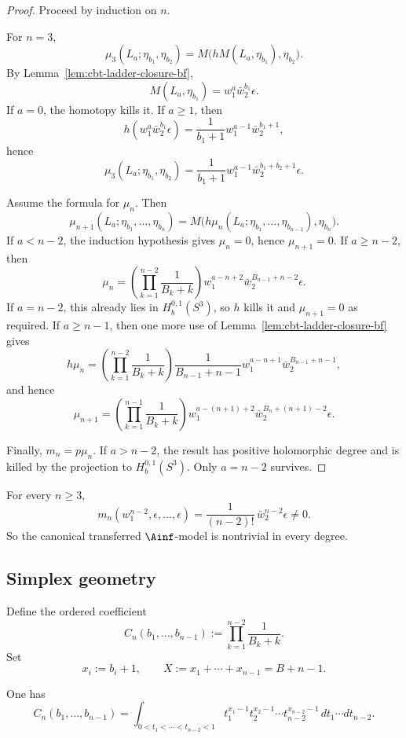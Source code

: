 \begin{proof}
Proceed by induction on $n$.

For $n=3$,
\[
\mu_3(L_a;\eta_{b_1},\eta_{b_2})
=
M\bigl(hM(L_a,\eta_{b_1}),\eta_{b_2}\bigr).
\]
By Lemma~\ref{lem:cbt-ladder-closure-bf},
\[
M(L_a,\eta_{b_1})=w_1^a\bar w_2^{b_1}\epsilon.
\]
If $a=0$, the homotopy kills it. If $a\ge1$, then
\[
h(w_1^a\bar w_2^{b_1}\epsilon)
=
\frac{1}{b_1+1}w_1^{a-1}\bar w_2^{b_1+1},
\]
hence
\[
\mu_3(L_a;\eta_{b_1},\eta_{b_2})
=
\frac{1}{b_1+1}w_1^{a-1}\bar w_2^{b_1+b_2+1}\epsilon.
\]

Assume the formula for $\mu_n$. Then
\[
\mu_{n+1}(L_a;\eta_{b_1},\dots,\eta_{b_n})
=
M\bigl(h\mu_n(L_a;\eta_{b_1},\dots,\eta_{b_{n-1}}),\eta_{b_n}\bigr).
\]
If $a<n-2$, the induction hypothesis gives $\mu_n=0$, hence $\mu_{n+1}=0$. If $a\ge n-2$, then
\[
\mu_n=
\left(\prod_{k=1}^{n-2}\frac{1}{B_k+k}\right)
w_1^{a-n+2}\bar w_2^{B_{n-1}+n-2}\epsilon.
\]
If $a=n-2$, this already lies in $H_b^{0,1}(S^3)$, so $h$ kills it and $\mu_{n+1}=0$ as required. If $a\ge n-1$, then one more use of Lemma~\ref{lem:cbt-ladder-closure-bf} gives
\[
h\mu_n=
\left(\prod_{k=1}^{n-2}\frac{1}{B_k+k}\right)
\frac{1}{B_{n-1}+n-1}
w_1^{a-n+1}\bar w_2^{B_{n-1}+n-1},
\]
and hence
\[
\mu_{n+1}=
\left(\prod_{k=1}^{n-1}\frac{1}{B_k+k}\right)
w_1^{a-(n+1)+2}\bar w_2^{B_n+(n+1)-2}\epsilon.
\]

Finally, $m_n=p\mu_n$. If $a>n-2$, the result has positive holomorphic degree and is killed by the projection to $H_b^{0,1}(S^3)$. Only $a=n-2$ survives.
\end{proof}

\begin{corollary}
\label{cor:cbt-all-degrees-nonzero}
\ClaimStatusProvedHere
For every $n\ge3$,
\[
m_n(w_1^{n-2},\epsilon,\dots,\epsilon)
=
\frac{1}{(n-2)!}\,\bar w_2^{n-2}\epsilon\neq0.
\]
So the canonical transferred $\Ainf$-model is nontrivial in every degree.
\end{corollary}

\subsection{Simplex geometry}
\label{sec:cbt-simplex-geometry}

Define the ordered coefficient
\[
C_n(b_1,\dots,b_{n-1})
:=
\prod_{k=1}^{n-2}\frac{1}{B_k+k}.
\]
Set
\[
x_i:=b_i+1,
\qquad
X:=x_1+\cdots+x_{n-1}=B+n-1.
\]

\begin{proposition}
\label{prop:cbt-simplex-integral}
\ClaimStatusProvedHere
One has
\[
C_n(b_1,\dots,b_{n-1})
=
\int_{0<t_1<\cdots<t_{n-2}<1}
t_1^{x_1-1}t_2^{x_2-1}\cdots t_{n-2}^{x_{n-2}-1}\,
dt_1\cdots dt_{n-2}.
\]
\end{proposition}

